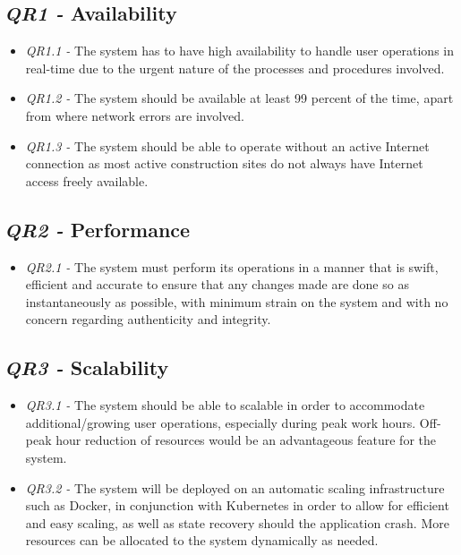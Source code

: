 \documentclass[11pt]{article}
\begin{document}
\subsection{\textit{QR1 -} Availability}
\begin{itemize}
    \item \textit{QR1.1 -} The system has to have high availability to handle user operations in real-time due to the urgent nature of the processes and procedures involved.
    \item \textit{QR1.2 -} The system should be available at least 99 percent of the time, apart from where network errors are involved.
    \item \textit{QR1.3 -} The system should be able to operate without an active Internet connection as most active construction sites do not always have Internet access freely available.
\end{itemize}

\subsection{\textit{QR2 -} Performance}
\begin{itemize}
    \item \textit{QR2.1 -} The system must perform its operations in a manner that is swift, efficient and accurate to ensure that any changes made are done so as instantaneously as possible, with minimum strain on the system and with no concern regarding authenticity and integrity.
\end{itemize}

\subsection{\textit{QR3 -} Scalability}
\begin{itemize}
    \item \textit{QR3.1 -} The system should be able to scalable in order to accommodate additional/growing user operations, especially during peak work hours. Off-peak hour reduction of resources would be an advantageous feature for the system.
    \item \textit{QR3.2 -} The system will be deployed on an automatic scaling infrastructure such as Docker, in conjunction with Kubernetes in order to allow for efficient and easy scaling, as well as state recovery should the application crash. More resources can be allocated to the system dynamically as needed.
\end{itemize}
\end{document}

